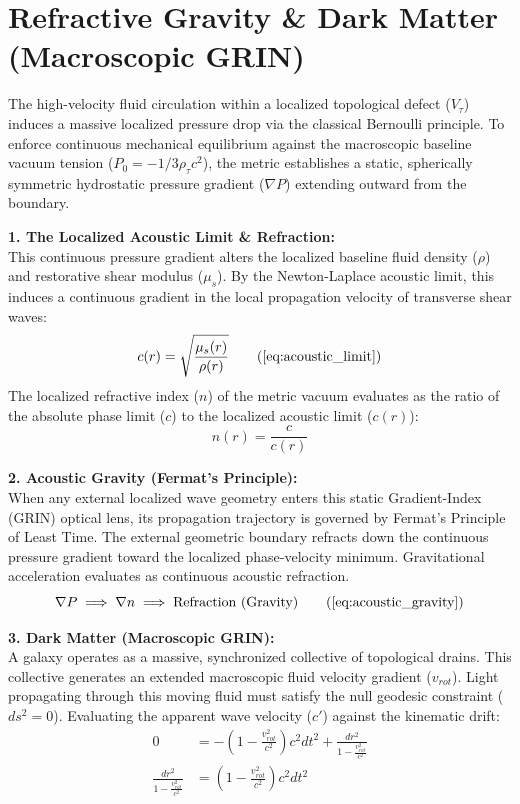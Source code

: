 \documentclass[11pt, a4paper]{article}
\begin{document}
\section{Refractive Gravity \& Dark Matter (Macroscopic GRIN)}
\label{sec:deriv_macroscopic_grin}

The high-velocity fluid circulation within a localized topological defect ($V_\tau$) induces a massive localized pressure drop via the classical Bernoulli principle. To enforce continuous mechanical equilibrium against the macroscopic baseline vacuum tension ($P_0 = -1/3\rho_{\tau} c^2$), the metric establishes a static, spherically symmetric hydrostatic pressure gradient ($\nabla P$) extending outward from the boundary.

\textbf{1. The Localized Acoustic Limit \& Refraction:} \\
This continuous pressure gradient alters the localized baseline fluid density ($\rho$) and restorative shear modulus ($\mu_s$). By the Newton-Laplace acoustic limit, this induces a continuous gradient in the local propagation velocity of transverse shear waves:
\begin{equation}
    c(r) = \sqrt{\frac{\mu_s(r)}{\rho(r)}} \tag{\ref{eq:acoustic_limit}}
\end{equation}
The localized refractive index ($n$) of the metric vacuum evaluates as the ratio of the absolute phase limit ($c$) to the localized acoustic limit ($c(r)$):
\begin{equation}
    n(r) = \frac{c}{c(r)} 
\end{equation}

\textbf{2. Acoustic Gravity (Fermat's Principle):} \\
When any external localized wave geometry enters this static Gradient-Index (GRIN) optical lens, its propagation trajectory is governed by Fermat's Principle of Least Time. The external geometric boundary refracts down the continuous pressure gradient toward the localized phase-velocity minimum. Gravitational acceleration evaluates as continuous acoustic refraction.
\begin{equation}
    \nabla P \implies \nabla n \implies \text{Refraction (Gravity)} \tag{\ref{eq:acoustic_gravity}}
\end{equation}

\textbf{3. Dark Matter (Macroscopic GRIN):} \\
A galaxy operates as a massive, synchronized collective of topological drains. This collective generates an extended macroscopic fluid velocity gradient ($v_{rot}$). Light propagating through this moving fluid must satisfy the null geodesic constraint ($ds^2 = 0$). Evaluating the apparent wave velocity ($c'$) against the kinematic drift:
\begin{align}
    0 &= -\left(1 - \frac{v_{rot}^2}{c^2}\right)c^2 dt^2 + \frac{dr^2}{1 - \frac{v_{rot}^2}{c^2}}  \\
    \frac{dr^2}{1 - \frac{v_{rot}^2}{c^2}} &= \left(1 - \frac{v_{rot}^2}{c^2}\right)c^2 dt^2 
\end{align}
\end{document}
